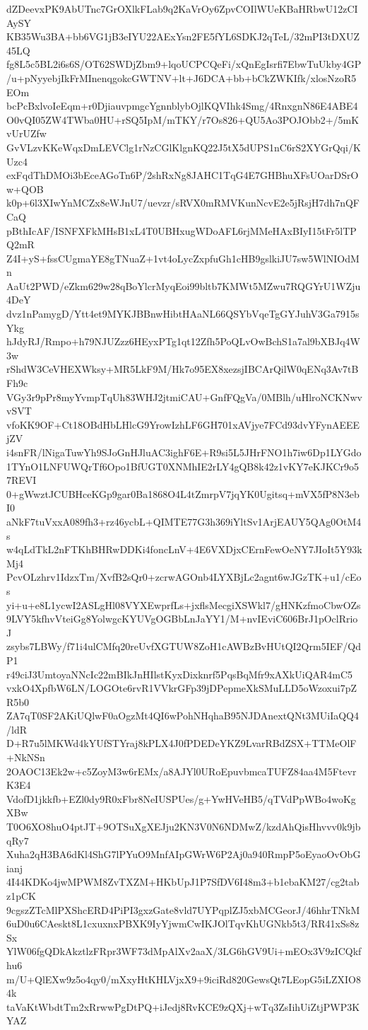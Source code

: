 dZDeevxPK9AbUTnc7GrOXlkFLab9q2KaVrOy6ZpvCOIlWUeKBaHRbwU12zCIAySY
KB35Wu3BA+bb6VG1jB3eIYU22AExYsn2FE5fYL6SDKJ2qTeL/32mPI3tDXUZ45LQ
fg8L5c5BL2i6s6S/OT62SWDjZbm9+lqoUCPCQeFi/xQnEgIsrfi7EbwTuUkby4GP
/u+pNyyebjIkFrMInenqgokcGWTNV+lt+J6DCA+bb+bCkZWKIfk/xlosNzoR5EOm
bcPcBxlvoIeEqm+r0DjiauvpmgcYgnnblybOjlKQVIhk4Smg/4RnxgnN86E4ABE4
O0vQI05ZW4TWba0HU+rSQ5IpM/mTKY/r7Os826+QU5Ao3POJObb2+/5mKvUrUZfw
GvVLzvKKeWqxDmLEVClg1rNzCGlKlgnKQ22J5tX5dUPS1nC6rS2XYGrQqi/KUzc4
exFqdThDMOi3bEceAGoTn6P/2shRxNg8JAHC1TqG4E7GHBhuXFsUOarDSrOw+QOB
k0p+6l3XIwYnMCZx8eWJnU7/uevzr/sRVX0mRMVKunNcvE2e5jRsjH7dh7nQFCaQ
pBthIcAF/ISNFXFkMHsB1xL4T0UBHxugWDoAFL6rjMMeHAxBIyI15tFr5lTPQ2mR
Z4I+yS+fssCUgmaYE8gTNuaZ+1vt4oLycZxpfuGh1cHB9gslkiJU7sw5WlNIOdMn
AaUt2PWD/eZkm629w28qBoYlcrMyqEoi99bltb7KMWt5MZwu7RQGYrU1WZju4DeY
dvz1nPamygD/Ytt4et9MYKJBBnwHibtHAaNL66QSYbVqeTgGYJuhV3Ga7915sYkg
hJdyRJ/Rmpo+h79NJUZzz6HEyxPTg1qt12Zfh5PoQLvOwBchS1a7al9bXBJq4W3w
rShdW3CeVHEXWksy+MR5LkF9M/Hk7o95EX8xezsjIBCArQilW0qENq3Av7tBFh9c
VGy3r9pPr8myYvmpTqUh83WHJ2jtmiCAU+GnfFQgVa/0MBlh/uHlroNCKNwvvSVT
vfoKK9OF+Ct18OBdHbLHlcG9YrowIzhLF6GH701xAVjye7FCd93dvYFynAEEEjZV
i4snFR/lNigaTuwYh9SJoGnHJluAC3ighF6E+R9si5L5JHrFNO1h7iw6Dp1LYGdo
1TYnO1LNFUWQrTf6Opo1BfUGT0XNMhIE2rLY4gQB8k42z1vKY7eKJKCr9o57REVI
0+gWwztJCUBHceKGp9gar0Ba1868O4L4tZmrpV7jqYK0Ugitsq+mVX5fP8N3ebI0
aNkF7tuVxxA089fh3+rz46ycbL+QIMTE77G3h369iYltSv1ArjEAUY5QAg0OtM4s
w4qLdTkL2nFTKhBHRwDDKi4foncLnV+4E6VXDjxCErnFewOeNY7JIoIt5Y93kMj4
PcvOLzhrv1IdzxTm/XvfB2sQr0+zcrwAGOnb4LYXBjLc2agnt6wJGzTK+u1/cEos
yi+u+e8L1ycwI2ASLgHl08VYXEwprfLs+jxflsMecgiXSWkl7/gHNKzfmoCbwOZs
9LVY5kfhvVteiGg8YolwgcKYUVgOGBbLnJaYY1/M+nvIEviC606BrJ1pOclRrioJ
zsybs7LBWy/f71i4ulCMfq20reUvfXGTUW8ZoH1cAWBzBvHUtQI2Qrm5IEF/QdP1
r49ciJ3UmtoyaNNcIc22mBIkJnHIlstKyxDixknrf5PqsBqMfr9xAXkUiQAR4mC5
vxkO4XpfbW6LN/LOGOte6rvR1VVkrGFp39jDPepmeXkSMuLLD5oWzoxui7pZR5b0
ZA7qT0SF2AKiUQlwF0aOgzMt4QI6wPohNHqhaB95NJDAnextQNt3MUiIaQQ4/ldR
D+R7u5lMKWd4kYUfSTYraj8kPLX4J0fPDEDeYKZ9LvarRBdZSX+TTMeOlF+NkNSn
2OAOC13Ek2w+c5ZoyM3w6rEMx/a8AJYl0URoEpuvbmcaTUFZ84aa4M5FtevrK3E4
VdofD1jkkfb+EZl0dy9R0xFbr8NeIUSPUes/g+YwHVeHB5/qTVdPpWBo4woKgXBw
T0O6XO8huO4ptJT+9OTSuXgXEJju2KN3V0N6NDMwZ/kzdAhQisHhvvv0k9jbqRy7
Xuha2qH3BA6dKl4ShG7lPYuO9MnfAIpGWrW6P2Aj0a940RmpP5oEyaoOvObGianj
4I44KDKo4jwMPWM8ZvTXZM+HKbUpJ1P7SfDV6I48m3+b1ebaKM27/cg2tabz1pCK
9cgszZTcMlPXShcERD4PiPI3gxzGate8vld7UYPqplZJ5xbMCGeorJ/46hhrTNkM
6uD0u6CAeskt8L1cxuxnxPBXK9IyYjwmCwIKJOlTqvKhUGNkb5t3/RR41xSs8zSx
YlW06fgQDkAkztlzFRpr3WF73dMpAlXv2aaX/3LG6hGV9Ui+mEOx3V9zICQkfhu6
m/U+QlEXw9z5o4qy0/mXxyHtKHLVjxX9+9iciRd820GewsQt7LEopG5iLZXIO84k
taVaKtWbdtTm2xRrwwPgDtPQ+iJedj8RvKCE9zQXj+wTq3ZsIihUiZtjPWP3KYAZ
